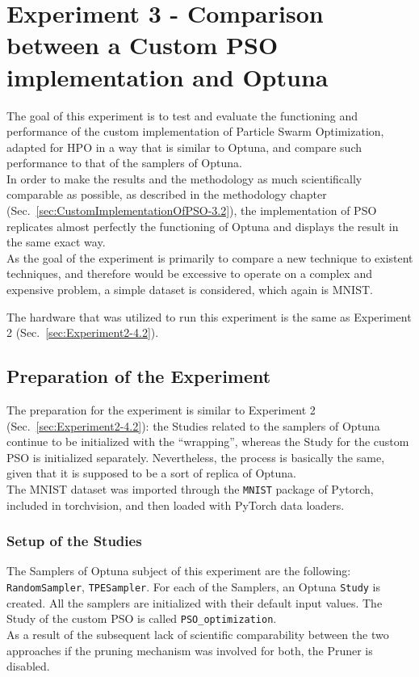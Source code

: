 \section[Experiment 3 - Comparison: Custom PSO vs Optuna]{Experiment 3 - Comparison between a Custom PSO implementation and Optuna}

The goal of this experiment is to test and evaluate the functioning and performance of the custom implementation of Particle Swarm Optimization, adapted for HPO in a way that is similar to Optuna, and compare such performance to that of the samplers of Optuna.
\\[0.3cm]In order to make the results and the methodology as much scientifically comparable as possible, as described in the methodology chapter (Sec.~\ref{sec:CustomImplementationOfPSO-3.2}), the implementation of PSO replicates almost perfectly the functioning of Optuna and displays the result in the same exact way.
\\[0.3cm]As the goal of the experiment is primarily to compare a new technique to existent techniques, and therefore would be excessive to operate on a complex and expensive problem, a simple dataset is considered, which again is MNIST.

The hardware that was utilized to run this experiment is the same as Experiment 2 (Sec.~\ref{sec:Experiment2-4.2}).

\subsection{Preparation of the Experiment}

The preparation for the experiment is similar to Experiment 2 (Sec.~\ref{sec:Experiment2-4.2}): the Studies related to the samplers of Optuna continue to be initialized with the “wrapping”, whereas the Study for the custom PSO is initialized separately. Nevertheless, the process is basically the same, given that it is supposed to be a sort of replica of Optuna. 
\\[0.3cm]The MNIST dataset was imported through the \texttt{MNIST} package of Pytorch, included in torchvision, and then loaded with PyTorch data loaders.

\subsubsection{Setup of the Studies}

The Samplers of Optuna subject of this experiment are the following: \texttt{RandomSampler}, \texttt{TPESampler}.
For each of the Samplers, an Optuna \texttt{Study} is created. All the samplers are initialized with their default input values.
The Study of the custom PSO is called \texttt{PSO\_optimization}.
\\[0.3cm]As a result of the subsequent lack of scientific comparability between the two approaches if the pruning mechanism was involved for both, the Pruner is disabled.

